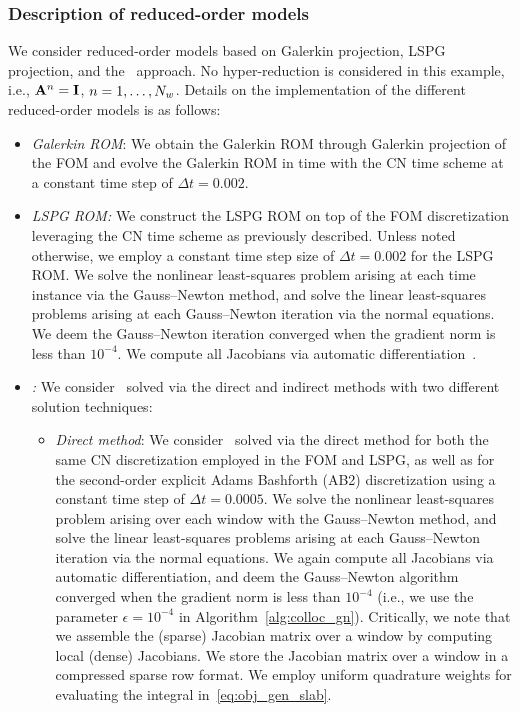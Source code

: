 \subsubsection{Description of reduced-order models}\label{sec:sod_rom_description}
We consider reduced-order models based on Galerkin projection, LSPG
projection, and the \methodAcronym\ approach. No hyper-reduction is considered 
in this example, i.e., $\mathbf{A}^{n} = \mathbf{I}$, $n=1,\ldots,N_w$. Details on the implementation of the 
different reduced-order models is as follows:
\begin{itemize}
\item \textit{Galerkin ROM}: We obtain the Galerkin ROM through Galerkin projection of the FOM and evolve the Galerkin ROM in time with the CN time scheme at a constant time step of $ \Delta t = 0.002$.

\item \textit{LSPG ROM:} We construct the LSPG ROM on top of the FOM
	discretization leveraging the CN time scheme as previously described. Unless
		noted otherwise, we employ a constant time step size of $\Delta t =
		0.002$ for the LSPG ROM. We solve the nonlinear least-squares problem arising at each time instance
		via the Gauss--Newton method, and solve the linear least-squares problems
		arising at each Gauss--Newton iteration via the normal
		equations. We deem the Gauss--Newton iteration converged when the gradient norm is less than $10^{-4}$.  We compute all Jacobians via automatic
		differentiation~\cite{adolc}. 
\item \textit{\methodAcronymROM:} We consider \methodAcronymROMs\ solved via the
	direct and indirect methods with two different solution techniques:
\begin{itemize}
	\item \textit{Direct method}: We consider \methodAcronymROMs\ solved via the direct method for both the same CN discretization employed in the FOM and LSPG, as well as for the second-order explicit Adams Bashforth (AB2) discretization using a constant time step of $\Delta t = 0.0005$. We solve the nonlinear least-squares problem 
arising over each window with the Gauss--Newton method, and solve the linear
		least-squares problems arising at each Gauss--Newton iteration 
		via the normal equations. We again compute all Jacobians via automatic
		differentiation, and deem the Gauss--Newton algorithm converged when
		the gradient norm is less than $10^{-4}$ (i.e., we use the parameter $\epsilon = 10^{-4}$ in Algorithm~\ref{alg:colloc_gn}). Critically, we note that we assemble the (sparse) Jacobian 
matrix over a window by computing local (dense) Jacobians. We store the Jacobian matrix over a window in a compressed sparse row format. We employ uniform quadrature weights for evaluating the integral in~\eqref{eq:obj_gen_slab}. 


\end{itemize}
\end{itemize}
